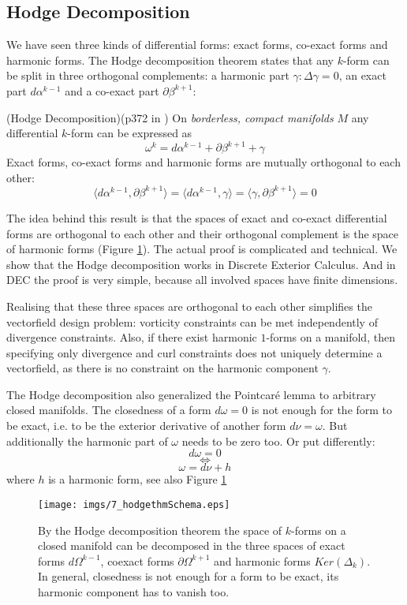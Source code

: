 \subsection{Hodge Decomposition}
\label{sec:VF_hodgeDecomp}

We have seen three kinds of differential forms: exact forms, co-exact forms and harmonic forms. 
The Hodge decomposition theorem states that any $k$-form can be split in three orthogonal complements: a harmonic part $\gamma: \Delta \gamma = 0$, an exact part $d\alpha^{k-1}$ and a co-exact part $\partial \beta^{k+1}$:
\begin{thm}(Hodge Decomposition)(p372 in \cite{FRANKEL11})
On \emph{borderless, compact manifolds} $M$ any differential $k$-form can be expressed as
\[\omega^k = d\alpha^{k-1} + \partial \beta^{k+1} + \gamma\]
Exact forms, co-exact forms and harmonic forms are mutually orthogonal to each other:
\[\langle d \alpha^{k-1}, \partial \beta^{k+1}\rangle = \langle d \alpha^{k-1}, \gamma\rangle = \langle \gamma, \partial \beta^{k+1}\rangle =0\]
\end{thm}

The idea  behind this result is that the spaces of exact and co-exact differential forms are orthogonal to each other and their orthogonal complement is the space of harmonic forms (Figure \ref{fig:hodgeDecomp}). The actual proof is complicated and technical.
We show that the Hodge decomposition works in Discrete Exterior Calculus. And in DEC the proof is very simple, because all involved spaces have finite dimensions. 

Realising that these three spaces are orthogonal to each other simplifies the vectorfield design problem: vorticity constraints can be met independently of divergence constraints.
Also, if there exist harmonic $1$-forms on a manifold, then specifying only divergence and curl constraints does not uniquely determine a vectorfield, as there is no constraint on the harmonic component $\gamma$.

The Hodge decomposition also generalized the Pointcar\'e lemma to arbitrary closed manifolds. The closedness of a form $d\omega = 0$ is not enough for the form to be exact, i.e. to be the exterior derivative of another form $d\nu = \omega$. But additionally the harmonic part of $\omega$ needs to be zero too. Or put differently:
\[d \omega = 0\]
\[\Leftrightarrow\]
\[\omega = d \nu + h\]
where $h$ is a harmonic form, see also Figure \ref{fig:hodgeDecomp}

\begin{figure}%
\begin{center}
\texttt{[image: imgs/7\_hodgethmSchema.eps]}%
\end{center}
\vspace{-0.5cm}
\caption{By the Hodge decomposition theorem the space of $k$-forms on a closed manifold can be decomposed in the three spaces  of exact forms $d\Omega^{k-1}$, coexact forms $\partial\Omega^{k+1}$ and harmonic forms $Ker(\Delta_k)$. In general, closedness is not enough for a form to be exact, its harmonic component has to vanish too.}%
\label{fig:hodgeDecomp}%
\end{figure}

